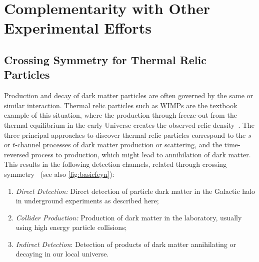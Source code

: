 \section{Complementarity with Other Experimental Efforts}\label{sec:complementarity}

\subsection{Crossing Symmetry for Thermal Relic Particles}

Production and decay of dark matter particles are often governed by the same or similar interaction. Thermal relic particles such as WIMPs are the textbook example of this situation, where the production through freeze-out from the thermal equilibrium in the early Universe creates the observed relic density~\cite{Srednicki:1988ce, Bertone:2004pz, Feng:2010gw}. The three principal approaches to discover thermal relic particles correspond to the $s$- or $t$-channel processes of dark matter production or scattering, and the time-reversed process to production, which might lead to annihilation of dark matter. This results in the following detection channels, related through crossing symmetry~\cite{Profumo:2013hqa} (see also \autoref{fig:basicfeyn}):

\begin{enumerate}
    \item{\textit{Direct Detection:}} Direct detection of particle dark matter in the Galactic halo in underground experiments as described here;
    \item{\textit{Collider Production:}} Production of dark matter in the laboratory, usually using high energy particle collisions;
    \item{\textit{Indirect Detection}}: Detection of products of dark matter annihilating or decaying in our local universe.
\end{enumerate}

